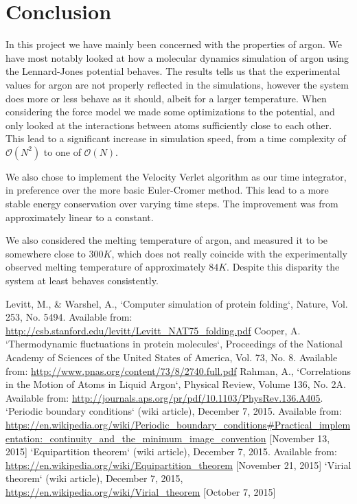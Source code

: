 \documentclass[a4paper]{article}
\begin{document}
\section{Conclusion}
\label{sec:conclusion}

In this project we have mainly been concerned with the properties of argon. We
have most notably looked at how a molecular dynamics simulation of argon using
the Lennard-Jones potential behaves.  The results tells us that the
experimental values for argon are not properly reflected in the simulations,
however the system does more or less behave as it should, albeit for a larger
temperature. When considering the force model we made some optimizations to the
potential, and only looked at the interactions between atoms sufficiently close
to each other. This lead to a significant increase in simulation speed, from a
time complexity of $\mathcal{O}(N^2)$ to one of $\mathcal{O}(N)$.

We also chose to implement the Velocity Verlet algorithm as our time
integrator, in preference over the more basic Euler-Cromer method. This lead to
a more stable energy conservation over varying time steps. The improvement was
from approximately linear to a constant. 

We also considered the melting temperature of argon, and measured it to be
somewhere close to $300K$, which does not really coincide with the
experimentally observed melting temperature of approximately $84K$. Despite
this disparity the system at least behaves consistently.

\begin{thebibliography}{9}
    Levitt, M., \& Warshel, A., `Computer simulation of protein folding`, Nature, Vol. 253, No. 5494. Available from: \url{http://csb.stanford.edu/levitt/Levitt_NAT75_folding.pdf}
    Cooper, A. `Thermodynamic fluctuations in protein molecules`, Proceedings of the National Academy of Sciences of the United States of America, Vol. 73, No. 8. Available from: \url{http://www.pnas.org/content/73/8/2740.full.pdf}
    Rahman, A., `Correlations in the Motion of Atoms in Liquid Argon`, Physical Review, Volume 136, No. 2A. Available from: \url{http://journals.aps.org/pr/pdf/10.1103/PhysRev.136.A405}.
    `Periodic boundary conditions` (wiki article), December 7, 2015. Available from: \url{https://en.wikipedia.org/wiki/Periodic_boundary_conditions#Practical_implementation:_continuity_and_the_minimum_image_convention} [November 13, 2015]
    `Equipartition theorem` (wiki article), December 7, 2015.
    Available from: \url{https://en.wikipedia.org/wiki/Equipartition\_theorem} [November 21, 2015]
    `Virial theorem` (wiki article), December 7, 2015, \url{https://en.wikipedia.org/wiki/Virial_theorem} [October 7, 2015]
\end{thebibliography}
\end{document}
